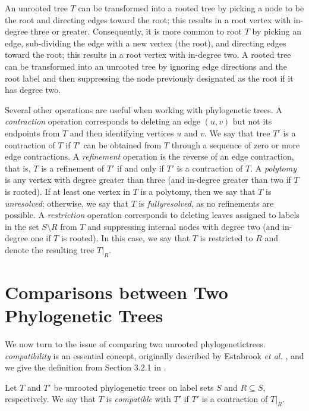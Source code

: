 An unrooted tree $T$ can be transformed into a rooted tree by picking a node to be the root and directing edges toward the root; this results in a root vertex with in-degree three or greater.
Consequently, it is more common to root $T$ by picking an edge, sub-dividing the edge with a new vertex (the root), and directing edges toward the root; this results in a root vertex with in-degree two.
A rooted tree can be transformed into an unrooted tree by ignoring edge directions and the root label and then suppressing the node previously designated as the root if it has degree two.

Several other operations are useful when working with phylogenetic trees.
A \textit{\gls{contraction}} operation corresponds to deleting an edge $(u,v)$ but not its endpoints from $T$ and then identifying vertices $u$ and $v$.
We say that tree $T'$ is a contraction of $T$ if $T'$ can be obtained from $T$ through a sequence of zero or more edge contractions.
A \textit{\gls{refinement}} operation is the reverse of an edge contraction, that is, $T$ is a refinement of $T'$ if and only if $T'$ is a contraction of $T$.
A \textit{\gls{polytomy}} is any vertex with degree greater than three (and in-degree greater than two if $T$ is rooted).
If at least one vertex in $T$ is a polytomy, then we say that $T$ is \textit{\gls{unresolved}}; otherwise, we say that $T$ is \textit{\gls{fullyresolved}}, as no refinements are possible.
A \textit{\gls{restriction}} operation corresponds to deleting leaves assigned to labels in the set $S \setminus R$ from $T$ and suppressing internal nodes with degree two (and in-degree one if $T$ is rooted). 
In this case, we say that $T$ is restricted to $R$ and denote the resulting tree $T |_R$.

\section{Comparisons between Two Phylogenetic Trees}
\label{sec:background-compare}
We now turn to the issue of comparing two \gls{unrooted} \glspl{phylogenetictree}.
\textit{\Gls{compatibility}} is an essential concept, originally described by Estabrook {\em et al.} \cite{estabrook1975idealized}, and we give the definition from Section 3.2.1 in \cite{warnow2017computational}.

\begin{definition}
\label{def:compatibility}
Let $T$  and $T'$ be unrooted phylogenetic trees on label sets $S$ and $R \subseteq S$, respectively. 
We say that $T$ is \emph{\gls{compatible}} with $T'$ if $T'$ is a \gls{contraction} of $T|_R$.
\end{definition}

